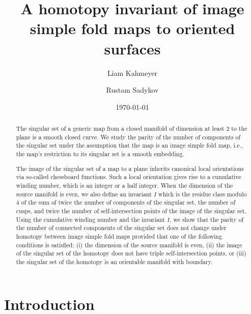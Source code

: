 \documentclass[12pt]{amsart}
\title[A homotopy invariant of image simple fold maps]{A homotopy invariant of image simple fold maps to oriented surfaces}
\author{Liam Kahmeyer}
\date{\today}
\author{Rustam Sadykov}
\theoremstyle{definition}
\begin{document}
\begin{abstract} 
	The singular set of a generic map from a closed manifold of dimension at least $2$ to the plane is a smooth closed curve. We study the parity of the number of components of the singular set under the assumption that the map is an image simple fold map, i.e., the map's restriction to its singular set is a smooth embedding.
	
	The image of the singular set of a map to a plane inherits canonical local orientations via so-called chessboard functions. Such a local orientation gives rise to a cumulative winding number, which is an integer or a half integer. When the dimension of the source manifold is even, we also define an invariant $I$ which is the residue class modulo 4 of the sum of twice the number of components of the singular set, the number of cusps, and twice the number of self-intersection points of the image of the singular set. Using the cumulative winding number and the invariant $I$, we show that the parity of the number of connected components of the singular set does not change under homotopy between image simple fold maps provided that one of the following conditions is satisfied: (i) the dimension of the source manifold is even, (ii) the image of the singular set of the homotopy does not have triple self-intersection points, or (iii) the singular set of the homotopy is an orientable manifold with boundary.  
\end{abstract} 
\maketitle

\section{Introduction}
\end{document}
